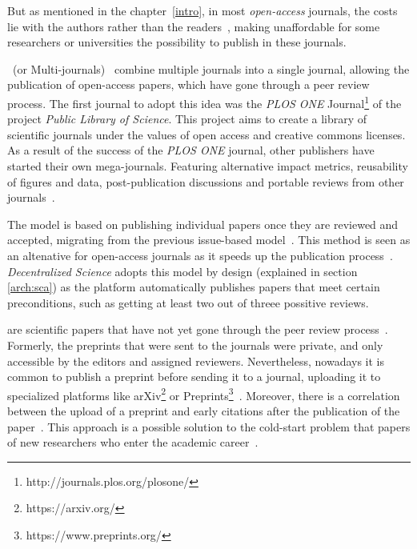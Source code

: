 But as mentioned in the chapter~\ref{intro}, in most \emph{open-access}
journals, the costs lie with the authors rather than the
readers~\cite{lariviere2015oligopoly,van2013true}, making unaffordable for some
researchers or universities the possibility to publish in these journals.

~(or Multi-journals)~\cite{binfield2013open,wellen2013open}
combine multiple journals into a single journal, allowing the publication of
open-access papers, which have gone through a peer review process. The first
journal to adopt this idea was the \emph{PLOS ONE}
Journal\footnote{http://journals.plos.org/plosone/} of the project \emph{Public
  Library of Science}. This project aims to create a library of scientific
journals under the values of open access and creative commons licenses. As a
result of the success of the \emph{PLOS ONE} journal, other publishers have
started their own mega-journals. Featuring alternative impact metrics,
reusability of figures and data, post-publication discussions and portable
reviews from other journals~\cite{bjork2015have}.

The  model is based on publishing individual papers
once they are reviewed and accepted, migrating from the previous issue-based
model~\cite{anderton2013continuous}. This method is seen as an altenative for
open-access journals as it speeds up the publication process~\cite{haymanview}.
\emph{Decentralized Science} adopts this model by design (explained in section
\ref{arch:sca}) as the platform automatically publishes papers that meet certain
preconditions, such as getting at least two out of threee possitive reviews.

 are scientific papers that have not yet gone through the peer
review process~\cite{harnad2003electronic}. Formerly, the preprints that were
sent to the journals were private, and only accessible by the editors and
assigned reviewers. Nevertheless, nowadays it is common to publish a preprint
before sending it to a journal, uploading it to specialized platforms like
arXiv\footnote{https://arxiv.org/} or
Preprints\footnote{https://www.preprints.org/}~\cite{brown2001volution}.
Moreover, there is a correlation between the upload of a preprint and early
citations after the publication of the paper~\cite{shuai2012scientific}. This
approach is a possible solution to the cold-start problem that papers of new
researchers who enter the academic career~\cite{sugiyama2010scholarly}.

